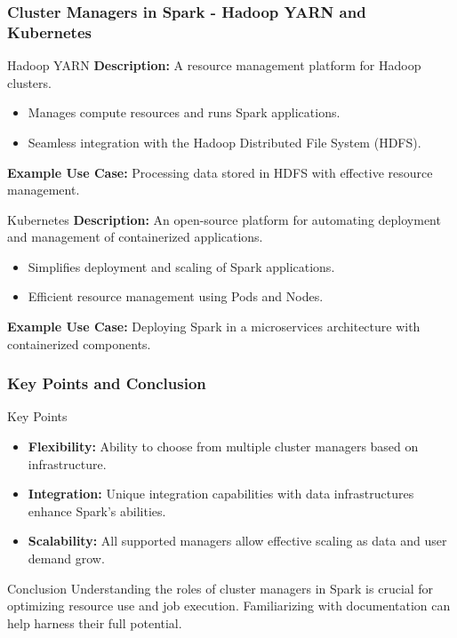 \documentclass[aspectratio=169]{beamer}
\begin{document}
\begin{frame}[fragile]
    \frametitle{Cluster Managers in Spark - Hadoop YARN and Kubernetes}
    \begin{block}{Hadoop YARN}
        \textbf{Description:} A resource management platform for Hadoop clusters.
        \begin{itemize}
            \item Manages compute resources and runs Spark applications.
            \item Seamless integration with the Hadoop Distributed File System (HDFS).
        \end{itemize}
        \textbf{Example Use Case:} Processing data stored in HDFS with effective resource management.
    \end{block}
    
    \begin{block}{Kubernetes}
        \textbf{Description:} An open-source platform for automating deployment and management of containerized applications.
        \begin{itemize}
            \item Simplifies deployment and scaling of Spark applications.
            \item Efficient resource management using Pods and Nodes.
        \end{itemize}
        \textbf{Example Use Case:} Deploying Spark in a microservices architecture with containerized components.
    \end{block}
\end{frame}

\begin{frame}[fragile]
    \frametitle{Key Points and Conclusion}
    \begin{block}{Key Points}
        \begin{itemize}
            \item \textbf{Flexibility:} Ability to choose from multiple cluster managers based on infrastructure.
            \item \textbf{Integration:} Unique integration capabilities with data infrastructures enhance Spark's abilities.
            \item \textbf{Scalability:} All supported managers allow effective scaling as data and user demand grow.
        \end{itemize}
    \end{block}
    
    \begin{block}{Conclusion}
        Understanding the roles of cluster managers in Spark is crucial for optimizing resource use and job execution. Familiarizing with documentation can help harness their full potential.
    \end{block}
\end{frame}
\end{document}
